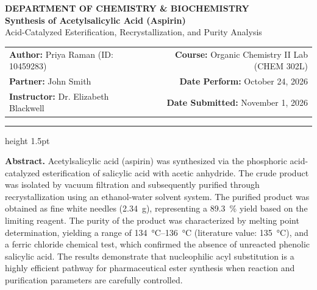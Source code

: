 \documentclass[11pt,a4paper]{article}
\begin{document}
\thispagestyle{plain}

\begin{center}
    \sffamily
    \textcolor{accent}{\large\textbf{DEPARTMENT OF CHEMISTRY \& BIOCHEMISTRY}}\\[0.8em]
    {\Huge\bfseries\color{accent} Synthesis of Acetylsalicylic Acid (Aspirin)}\\[0.5em]
    {\large\color{charcoal} Acid-Catalyzed Esterification, Recrystallization, and Purity Analysis}\\[1.5em]
    
    \small
    \begin{tabularx}{\linewidth}{X r}
        \textbf{Author:} Priya Raman (ID: 10459283) & \textbf{Course:} Organic Chemistry II Lab (CHEM 302L) \\
        \textbf{Partner:} John Smith & \textbf{Date Perform:} October 24, 2026 \\
        \textbf{Instructor:} Dr. Elizabeth Blackwell & \textbf{Date Submitted:} November 1, 2026 \\
    \end{tabularx}
\end{center}
\vspace{-0.5em}
{\color{accent}\hrule height 1.5pt}
\vspace{1.5em}

\begin{center}
\begin{minipage}{0.9\textwidth}
    \small
    \noindent\textbf{\sffamily\textcolor{accent}{Abstract.}} 
    Acetylsalicylic acid (aspirin) was synthesized via the phosphoric acid-catalyzed esterification of salicylic acid with acetic anhydride. The crude product was isolated by vacuum filtration and subsequently purified through recrystallization using an ethanol-water solvent system. The purified product was obtained as fine white needles (\qty{2.34}{\gram}), representing a \qty{89.3}{\percent} yield based on the limiting reagent. The purity of the product was characterized by melting point determination, yielding a range of \qtyrange{134}{136}{\degreeCelsius} (literature value: \qty{135}{\degreeCelsius}), and a ferric chloride chemical test, which confirmed the absence of unreacted phenolic salicylic acid. The results demonstrate that nucleophilic acyl substitution is a highly efficient pathway for pharmaceutical ester synthesis when reaction and purification parameters are carefully controlled.
\end{minipage}
\end{center}
\end{document}
